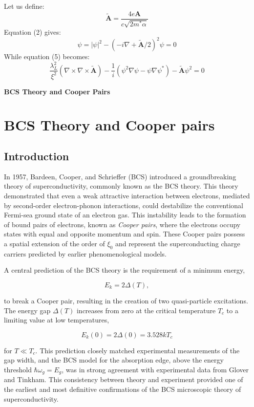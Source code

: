 \documentclass{article}
\begin{document}
Let us define:
\[
\tilde{\mathbf{A}} = \frac{4e \mathbf{A}}{c \sqrt{2m^* \alpha}} \tag{22}
\]
Equation (2) gives:
\[
\psi = |\psi|^2 - \left( -i \nabla + \tilde{\mathbf{A}}/2 \right)^2 \psi = 0 \tag{23}
\]
While equation (5) becomes:
\[
\frac{\lambda_L^2}{\xi^2} \left( \nabla \times \nabla \times \tilde{\mathbf{A}} \right) - \frac{1}{i} \left( \psi^2 \nabla \psi - \psi \nabla \psi^* \right) - \tilde{\mathbf{A}} \psi^2 = 0 \tag{24}
\]

\newpage
\begin{center}
    \textbf{\LARGE BCS Theory and Cooper Pairs}
\end{center}
\newpage 
\section{BCS Theory and Cooper pairs}

\subsection{Introduction}

In 1957, Bardeen, Cooper, and Schrieffer (BCS) introduced a groundbreaking theory of superconductivity, commonly known as the BCS theory. This theory demonstrated that even a weak attractive interaction between electrons, mediated by second-order electron-phonon interactions, could destabilize the conventional Fermi-sea ground state of an electron gas. This instability leads to the formation of bound pairs of electrons, known as \textit{Cooper pairs}, where the electrons occupy states with equal and opposite momentum and spin. These Cooper pairs possess a spatial extension of the order of $\xi_0$ and represent the superconducting charge carriers predicted by earlier phenomenological models.

A central prediction of the BCS theory is the requirement of a minimum energy,

\[
E_k = 2\Delta(T),
\]

to break a Cooper pair, resulting in the creation of two quasi-particle excitations. The energy gap $\Delta(T)$ increases from zero at the critical temperature $T_c$ to a limiting value at low temperatures,

\[
E_k(0) = 2\Delta(0) = 3.528 k T_c \tag{1}
\]

for $T \ll T_c$. This prediction closely matched experimental measurements of the gap width, and the BCS model for the absorption edge, above the energy threshold $\hbar \omega_g = E_g$, was in strong agreement with experimental data from Glover and Tinkham. This consistency between theory and experiment provided one of the earliest and most definitive confirmations of the BCS microscopic theory of superconductivity.
\end{document}
